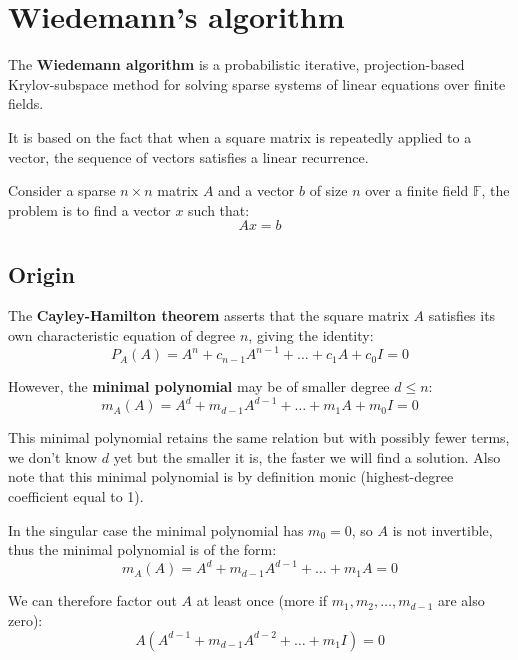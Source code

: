 \documentclass[a4paper, 11pt]{article}
\begin{document}
\newpage

\section{Wiedemann's algorithm}
The \textbf{Wiedemann algorithm} \cite{wiedemann} is a probabilistic iterative, projection-based Krylov-subspace method for solving sparse systems of linear equations over finite fields. 

It is based on the fact that when a square matrix is repeatedly applied to a
vector, the sequence of vectors satisfies a linear recurrence.

Consider a sparse $n \times n$ matrix $A$ and a vector $b$ of size $n$ over a finite field $\mathbb{F}$, the problem is to find a vector $x$ such that:
\begin{equation}
    Ax = b
\end{equation}

\subsection{Origin}
The \textbf{Cayley-Hamilton theorem} asserts that the square matrix $A$ satisfies its own characteristic equation of degree $n$, giving the identity:
\begin{equation}
    P_A(A) = A^n + c_{n-1}A^{n-1} + \dots + c_1A + c_0I = 0
\end{equation}

However, the \textbf{minimal polynomial} may be of smaller degree $d \leq n$:
\begin{equation}
    \label{eqn:minimal}
    m_A(A) = A^d + m_{d-1}A^{d-1} + \dots + m_1A + m_0I = 0
\end{equation}

This minimal polynomial retains the same relation but with possibly fewer terms, we don't know $d$ yet but the smaller it is, the faster we will find a solution. Also note that this minimal polynomial is by definition monic (highest-degree coefficient equal to 1).

In the singular case the minimal polynomial has $m_0=0$, so $A$ is not invertible, thus the minimal polynomial is of the form:
\begin{equation}
    m_A(A) = A^d + m_{d-1}A^{d-1} + \dots + m_1A = 0
\end{equation}

We can therefore factor out $A$ at least once (more if $m_1, m_2, \dots, m_{d-1}$ are also zero):
\begin{equation}
    A(A^{d-1} + m_{d-1}A^{d-2} + \dots + m_1I) = 0
\end{equation}
 
\end{document}
